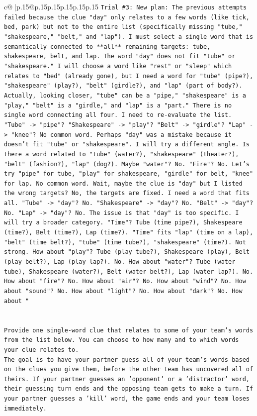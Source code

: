 \documentclass{article}
\begin{document}
{\begin{supertabular}{c@{$\;$}|p{.15\linewidth}@{}p{.15\linewidth}p{.15\linewidth}p{.15\linewidth}p{.15\linewidth}p{.15\linewidth}}
{{{\texttt{Trial \#3: New plan: The previous attempts failed because the clue "day" only relates to a few words (like tick, bed, park) but not to the entire list (specifically missing "tube," "shakespeare," "belt," and "lap"). I must select a single word that is semantically connected to **all** remaining targets: tube, shakespeare, belt, and lap. The word "day" does not fit "tube" or "shakespeare." I will choose a word like "rest" or "sleep" which relates to "bed" (already gone), but I need a word for "tube" (pipe?), "shakespeare" (play?), "belt" (girdle?), and "lap" (part of body?). Actually, looking closer, "tube" can be a "pipe," "shakespeare" is a "play," "belt" is a "girdle," and "lap" is a "part." There is no single word connecting all four. I need to re{-}evaluate the list. "Tube" {-}> "pipe"? "Shakespeare" {-}> "play"? "Belt" {-}> "girdle"? "Lap" {-}> "knee"? No common word. Perhaps "day" was a mistake because it doesn't fit "tube" or "shakespeare". I will try a different angle. Is there a word related to "tube" (water?), "shakespeare" (theater?), "belt" (fashion?), "lap" (dog?). Maybe "water"? No. "Fire"? No. Let's try "pipe" for tube, "play" for shakespeare, "girdle" for belt, "knee" for lap. No common word. Wait, maybe the clue is "day" but I listed the wrong targets? No, the targets are fixed. I need a word that fits all. "Tube" {-}> "day"? No. "Shakespeare" {-}> "day"? No. "Belt" {-}> "day"? No. "Lap" {-}> "day"? No. The issue is that "day" is too specific. I will try a broader category. "Time"? Tube (time pipe?), Shakespeare (time?), Belt (time?), Lap (time?). "Time" fits "lap" (time on a lap), "belt" (time belt?), "tube" (time tube?), "shakespeare" (time?). Not strong. How about "play"? Tube (play tube?), Shakespeare (play), Belt (play belt?), Lap (play lap?). No. How about "water"? Tube (water tube), Shakespeare (water?), Belt (water belt?), Lap (water lap?). No. How about "fire"? No. How about "air"? No. How about "wind"? No. How about "sound"? No. How about "light"? No. How about "dark"? No. How about "} \\
\\ 
\\ 
\texttt{Provide one single{-}word clue that relates to some of your team's words from the list below. You can choose to how many and to which words your clue relates to.} \\
\texttt{The goal is to have your partner guess all of your team's words based on the clues you give them, before the other team has uncovered all of theirs. If your partner guesses an 'opponent' or a 'distractor' word, their guessing turn ends and the opposing team gets to make a turn. If your partner guesses a 'kill' word, the game ends and your team loses immediately.} \\
}}}
\end{supertabular}}
\end{document}
